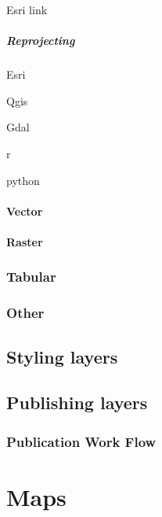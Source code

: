 \documentclass[
]{book}
\begin{document}
Esri link

\hypertarget{reprojecting}{%
\paragraph{Reprojecting}\label{reprojecting}}

Esri

Qgis

Gdal

r

python

\hypertarget{vector}{%
\subsubsection{Vector}\label{vector}}

\hypertarget{raster}{%
\subsubsection{Raster}\label{raster}}

\hypertarget{tabular}{%
\subsection{Tabular}\label{tabular}}

\hypertarget{other}{%
\subsection{Other}\label{other}}

\hypertarget{styling-layers}{%
\section{Styling layers}\label{styling-layers}}

\hypertarget{publishing-layers}{%
\section{Publishing layers}\label{publishing-layers}}

\hypertarget{publication-work-flow}{%
\subsection{Publication Work Flow}\label{publication-work-flow}}

\hypertarget{maps}{%
\chapter{Maps}\label{maps}}
\end{document}

